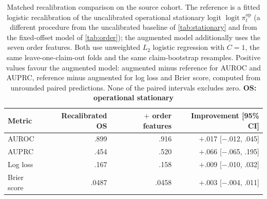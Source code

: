 \documentclass[11pt]{article}
\DeclareMathOperator{\logit}{logit}
\begin{document}
\begin{table}[!t]\centering\scriptsize
\setlength{\tabcolsep}{4pt}
\begin{tabular}{@{}lrrr@{}}
\toprule
Metric & Recalibrated OS & $+$ order features & Improvement [95\% CI] \\
\midrule
AUROC & .899 & .916 & $+$.017 [$-$.012, .045] \\
AUPRC & .454 & .520 & $+$.066 [$-$.065, .195] \\
Log loss & .167 & .158 & $+$.009 [$-$.010, .032] \\
Brier score & .0487 & .0458 & $+$.003 [$-$.004, .011] \\
\bottomrule
\end{tabular}
\caption{Matched recalibration comparison on the source cohort. The reference is a fitted logistic recalibration of the uncalibrated operational stationary logit $\logit\pi^{\mathrm{op}}_t$ (a different procedure from the uncalibrated baseline of \cref{tab:stationary} and from the fixed-offset model of \cref{tab:order}); the augmented model additionally uses the seven order features. Both use unweighted $L_2$ logistic regression with $C=1$, the same leave-one-claim-out folds and the same claim-bootstrap resamples. Positive values favour the augmented model: augmented minus reference for AUROC and AUPRC, reference minus augmented for log loss and Brier score, computed from unrounded paired predictions. None of the paired intervals excludes zero. \textbf{OS: operational stationary}}
\label{tab:matched}
\end{table}
\end{document}
